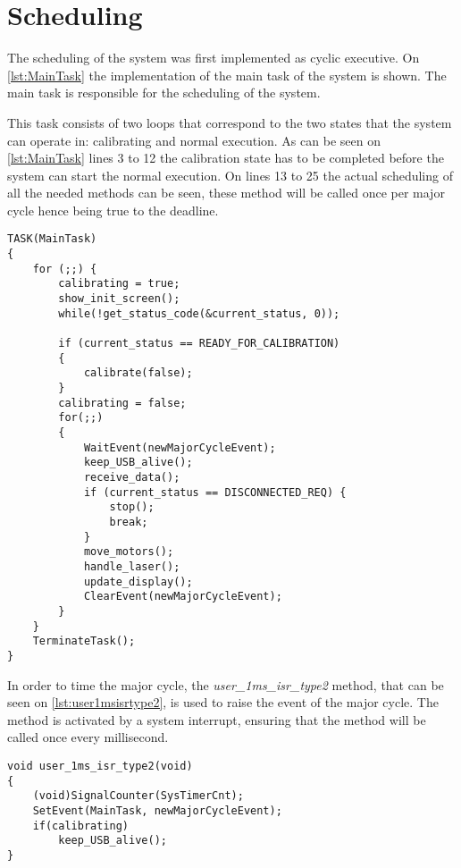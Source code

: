 \section{Scheduling}\label{solution:scheduling}
The scheduling of the system was first implemented as cyclic executive.
On \autoref{lst:MainTask} the implementation of the main task of the system is shown.
The main task is responsible for the scheduling of the system.

This task consists of two loops that correspond to the two states that the system can operate in: calibrating and normal execution.
As can be seen on \autoref{lst:MainTask} lines 3 to 12 the calibration state has to be completed before the system can start the normal execution.
On lines 13 to 25 the actual scheduling of all the needed methods can be seen, these method will be called once per major cycle hence being true to the deadline.

\begin{lstlisting}[language=CSharp,label={lst:MainTask},caption={MainTaks method from logic.c}]
TASK(MainTask)
{
    for (;;) {
        calibrating = true;
        show_init_screen();
        while(!get_status_code(&current_status, 0));

        if (current_status == READY_FOR_CALIBRATION)
        {
            calibrate(false);
        }
        calibrating = false;
        for(;;)
        {
            WaitEvent(newMajorCycleEvent);
            keep_USB_alive();
            receive_data();
            if (current_status == DISCONNECTED_REQ) {
                stop();
                break;
            }
            move_motors();
            handle_laser();
            update_display();
            ClearEvent(newMajorCycleEvent);
        }
    }
    TerminateTask();
}
\end{lstlisting}

In order to time the major cycle, the \textit{user\_1ms\_isr\_type2} method, that can be seen on \autoref{lst:user1msisrtype2}, is used to raise the event of the major cycle.
The method is activated by a system interrupt, ensuring that the method will be called once every millisecond.
\begin{lstlisting}[language=CSharp,label={lst:user1msisrtype2},caption={user\_1ms\_isr\_type2 method from nxt.c}]
void user_1ms_isr_type2(void)
{
    (void)SignalCounter(SysTimerCnt);
    SetEvent(MainTask, newMajorCycleEvent);
    if(calibrating)
        keep_USB_alive();
}
\end{lstlisting}


